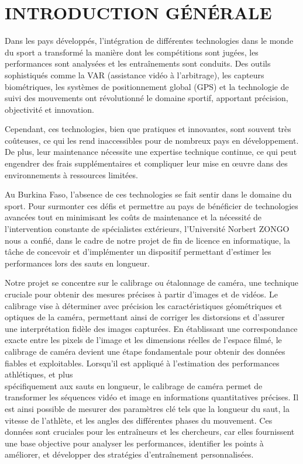 \chapter*{INTRODUCTION GÉNÉRALE}
\adjustmtc
\thispagestyle{MyStyle}


  Dans les pays développés, l'intégration de différentes technologies dans le monde du sport a transformé la manière dont les compétitions sont jugées, les performances sont analysées et les entraînements sont conduits. Des outils sophistiqués comme la VAR (assistance vidéo à l'arbitrage), les capteurs biométriques, les systèmes de positionnement global (GPS) et la technologie de suivi des mouvements ont révolutionné le domaine sportif, apportant précision, objectivité et innovation.
  
  Cependant, ces technologies, bien que pratiques et innovantes, sont souvent très coûteuses, ce qui les rend inaccessibles pour de nombreux pays en développement. De plus, leur maintenance nécessite une expertise technique continue, ce qui peut engendrer des frais supplémentaires et compliquer leur mise en œuvre dans des environnements à ressources limitées.
  
  Au Burkina Faso, l'absence de ces technologies se fait sentir dans le domaine du sport. Pour surmonter ces défis et permettre au pays de bénéficier de technologies avancées tout en minimisant les coûts de maintenance et la nécessité de l'intervention constante de spécialistes extérieurs, l'Université Norbert ZONGO nous a confié, dans le cadre de notre projet de fin de licence en informatique, la tâche de concevoir et d'implémenter un dispositif permettant d'estimer les performances lors des sauts en longueur.
  
  Notre projet se concentre sur le calibrage ou étalonnage de caméra, une technique cruciale pour obtenir des mesures précises à partir d'images et de vidéos. Le calibrage vise à déterminer avec précision les caractéristiques géométriques et optiques de la caméra, permettant ainsi de corriger les distorsions et d'assurer une interprétation fidèle des images capturées. En établissant une correspondance exacte entre les pixels de l'image et les dimensions réelles de l'espace filmé, le calibrage de caméra devient une étape fondamentale pour obtenir des données fiables et exploitables. Lorsqu'il est appliqué à l'estimation des performances athlétiques, et plus \\ spécifiquement aux sauts en longueur, le calibrage de caméra permet de transformer les séquences vidéo et image en informations quantitatives précises. Il est ainsi possible de mesurer des paramètres clé tels que la longueur du saut, la vitesse de l'athlète, et les angles des différentes phases du mouvement. Ces données sont cruciales pour les entraîneurs et les chercheurs, car elles fournissent une base objective pour analyser les performances, identifier les points à améliorer, et développer des stratégies d'entraînement personnalisées.
  
